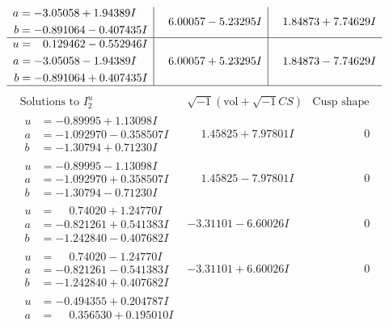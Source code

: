 \documentclass[1p]{elsarticle_modified}
\theoremstyle{definition}
\newcommand{\I}{\sqrt{-1}}
\begin{document}
$$\begin{array}{c|c|c}
\begin{aligned}
a &= -3.05058 + 1.94389 I \\
b &= -0.891064 - 0.407435 I\end{aligned}
 & \phantom{-}6.00057 - 5.23295 I & \phantom{-}1.84873 + 7.74629 I \\ \hline\begin{aligned}
u &= \phantom{-}0.129462 - 0.552946 I \\
a &= -3.05058 - 1.94389 I \\
b &= -0.891064 + 0.407435 I\end{aligned}
 & \phantom{-}6.00057 + 5.23295 I & \phantom{-}1.84873 - 7.74629 I\\
 \hline 
 \end{array}$$\newpage$$\begin{array}{c|c|c}  
\text{Solutions to }I^u_{2}& \I (\text{vol} + \sqrt{-1}CS) & \text{Cusp shape}\\
 \hline 
\begin{aligned}
u &= -0.89995 + 1.13098 I \\
a &= -1.092970 - 0.358507 I \\
b &= -1.30794 + 0.71230 I\end{aligned}
 & \phantom{-}1.45825 + 7.97801 I & \phantom{-0.000000 } 0 \\ \hline\begin{aligned}
u &= -0.89995 - 1.13098 I \\
a &= -1.092970 + 0.358507 I \\
b &= -1.30794 - 0.71230 I\end{aligned}
 & \phantom{-}1.45825 - 7.97801 I & \phantom{-0.000000 } 0 \\ \hline\begin{aligned}
u &= \phantom{-}0.74020 + 1.24770 I \\
a &= -0.821261 + 0.541383 I \\
b &= -1.242840 - 0.407682 I\end{aligned}
 & -3.31101 - 6.60026 I & \phantom{-0.000000 } 0 \\ \hline\begin{aligned}
u &= \phantom{-}0.74020 - 1.24770 I \\
a &= -0.821261 - 0.541383 I \\
b &= -1.242840 + 0.407682 I\end{aligned}
 & -3.31101 + 6.60026 I & \phantom{-0.000000 } 0 \\ \hline\begin{aligned}
u &= -0.494355 + 0.204787 I \\
a &= \phantom{-}0.356530 + 0.195010 I \\

\end{aligned}
\end{array}$$
\end{document}
